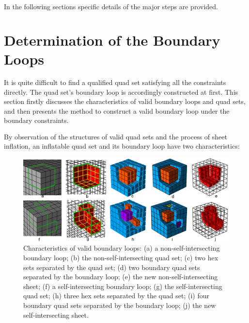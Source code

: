 \documentclass[final,5p,times,twocolumn]{elsarticle}
\begin{document}
In the following sections specific details of the major steps are provided.

\section{Determination of the Boundary Loops}
\label{sec:det_bound_loops}
It is quite difficult to find a qualified quad set satisfying all the constraints directly. The quad set's boundary loop is accordingly constructed at first. This section firstly discusses the characteristics of valid boundary loops and quad sets, and then presents the method to construct a valid boundary loop under the boundary constraints.

By observation of the structures of valid quad sets and the process of sheet inflation, an inflatable quad set and its boundary loop have two characteristics:

\begin{figure}[htbp]
\begin{center}
\includegraphics[width=15cm]{compo_loop_prop.png}
\caption{Characteristics of valid boundary loops: (a) a non-self-intersecting boundary loop; (b) the non-self-intersecting quad set; (c) two hex sets separated by the quad set; (d) two boundary quad sets separated by the boundary loop; (e) the new non-self-intersecting sheet; (f) a self-intersecting boundary loop; (g) the self-intersecting quad set; (h) three hex sets separated by the quad set; (i) four boundary quad sets separated by the boundary loop; (j) the new self-intersecting sheet.}
\label{fig:loop_prop}
\end{center}
\end{figure}
\end{document}
